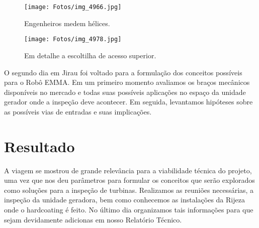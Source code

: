 \documentclass[a4paper,11pt,oneside,openany,brazilian,version=last,draft=false,]{main}
\begin{document}
\begin{twocolumn}
\begin{figure}[H]
\centering
\texttt{[image: Fotos/img\_4966.jpg]}
\caption{Engenheiros medem hélices.}
\end{figure}

\begin{figure}[H]
\centering
\texttt{[image: Fotos/img\_4978.jpg]}
\caption{Em detalhe a escoltilha de acesso superior.}
\end{figure}

O segundo dia em Jirau foi voltado para a formulação dos conceitos possíveis
para o Robô EMMA. Em um primeiro momento avaliamos os braços mecânicos
disponíveis no mercado e todas suas possíveis aplicações no espaço da unidade
gerador onde a inspeção deve acontecer. Em seguida, levantamos hipóteses sobre
as possíveis vias de entradas e suas implicações. 

\section{Resultado}
A viagem se mostrou de grande relevância para a viabilidade técnica do projeto,
uma vez que nos deu parâmetros para formular os conceitos que serão explorados
como soluções para a inspeção de turbinas. Realizamos as reuniões
necessárias, a inspeção da unidade geradora, bem como conhecemos as instalações
da Rijeza onde o hardcoating é feito. No último dia organizamos tais informações
para que sejam devidamente adicionas em nosso Relatório Técnico.
\end{twocolumn}
\end{document}
